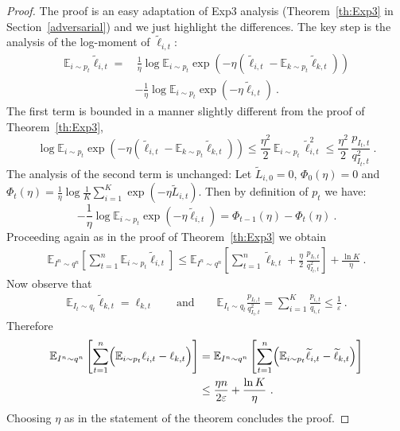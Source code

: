 \documentclass[11pt]{hackednow}
\newcommand{\E}{\mathbb{E}}
\renewcommand{\tilde}{\widetilde}
\newcommand{\ve}{\varepsilon}
\begin{document}
\begin{proof}
The proof is an easy adaptation of Exp3 analysis (Theorem~\ref{th:Exp3} in Section~\ref{adversarial}) and we just highlight the differences.
The key step is the analysis of the log-moment of $\tilde{\ell}_{i,t}$:
\begin{align*}
    \E_{i \sim p_t} \tilde{\ell}_{i,t} =&\, \frac{1}{\eta} \log \E_{i \sim p_t} \exp{\left(- \eta (\tilde{\ell}_{i,t} - \E_{k \sim p_t} \tilde{\ell}_{k,t}) \right)}
\\ &-
    \frac{1}{\eta} \log \E_{i \sim p_t} \exp{\left(- \eta \tilde{\ell}_{i,t} \right)}~.
\end{align*}
The first term is bounded in a manner slightly different from the proof of Theorem~\ref{th:Exp3},
\[
    \log \E_{i \sim p_t} \exp{\left(- \eta (\tilde{\ell}_{i,t} - \E_{k \sim p_t} \tilde{\ell}_{k,t}) \right)} 
\le
    \frac{\eta^2}{2}\,\E_{i \sim p_t}\,\tilde{\ell}_{i,t}^2
\le
    \frac{\eta^2}{2}\,\frac{p_{I_t,t}}{q_{I_t,t}^2}~.
\]
The analysis of the second term is unchanged:
Let $\tilde{L}_{i,0}=0$, $\Phi_0(\eta)=0$ and $\Phi_t(\eta) = \frac{1}{\eta} \log \frac{1}{K} \sum_{i=1}^K \exp{\left(- \eta \tilde{L}_{i,t}\right)}$. Then by definition of $p_t$ we have:
\[
    - \frac{1}{\eta} \log \E_{i \sim p_t} \exp{\left(- \eta \tilde{\ell}_{i,t} \right)} 
=
    \Phi_{t-1}(\eta) - \Phi_{t}(\eta)~.
\]
Proceeding again as in the proof of Theorem~\ref{th:Exp3} we obtain
\begin{align*}
    \E_{I^n \sim q^n}\left[\sum_{t=1}^n \E_{i \sim p_t} \tilde{\ell}_{i,t}\right]
\le
    \E_{I^n \sim q^n}\left[\sum_{t=1}^n \tilde{\ell}_{k,t} + \frac{\eta}{2}\,\frac{p_{I_t,t}}{q_{I_t,t}^2} \right] + \frac{\ln K}{\eta}~.
\end{align*}
Now observe that
\begin{align*}
    \E_{I_t \sim q_t} \tilde{\ell}_{k,t} = \ell_{k,t}
\qquad\text{and}\qquad
    \E_{I_t \sim q_t} \frac{p_{I_t,t}}{q_{I_t,t}^2} = \sum_{i=1}^K \frac{p_{i,t}}{q_{i,t}} \le \frac{1}{\ve}~.
\end{align*}
Therefore
\begin{align*}
    \E_{I^n \sim q^n}\left[\sum_{t=1}^n \Bigl( \E_{i \sim p_t} \ell_{i,t} - \ell_{k,t} \Bigr) \right]
&=
    \E_{I^n \sim q^n}\left[\sum_{t=1}^n \Bigl( \E_{i \sim p_t} \tilde{\ell}_{i,t} - \tilde{\ell}_{k,t} \Bigr) \right]
\\ &\le
    \frac{\eta n}{2\ve} + \frac{\ln K}{\eta}~.
\end{align*}
Choosing $\eta$ as in the statement of the theorem concludes the proof.
\end{proof}
\end{document}
